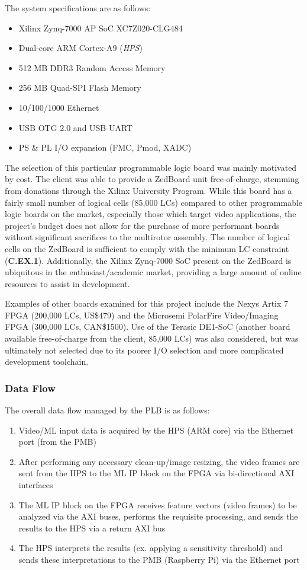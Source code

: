 The system specifications are as follows\cite{zedboard}:
\begin{itemize}
\item Xilinx Zynq-7000 AP SoC XC7Z020-CLG484
\item Dual-core ARM Cortex-A9 (\textit{HPS})
\item 512 MB DDR3 Random Access Memory
\item 256 MB Quad-SPI Flash Memory
\item 10/100/1000 Ethernet 
\item USB OTG 2.0 and USB-UART 
\item PS \& PL I/O expansion (FMC, Pmod, XADC)
\end{itemize}

The selection of this particular programmable logic board was mainly motivated by cost. The client was able to provide a ZedBoard unit free-of-charge, stemming from donations through the Xilinx University Program. While this board has a fairly small number of logical cells (85,000 LCs) compared to other programmable logic boards on the market, especially those which target video applications, the project's budget does not allow for the purchase of more performant boards without significant sacrifices to the multirotor assembly. The number of logical cells on the ZedBoard is sufficient to comply with the minimum LC constraint (\textbf{C.EX.1}). Additionally, the Xilinx Zynq-7000 SoC present on the ZedBoard is ubiquitous in the enthusiast/academic market, providing a large amount of online resources to assist in development.

Examples of other boards examined for this project include the Nexys Artix 7 FPGA (200,000 LCs, US\$479)\cite{nexys} and the Microsemi PolarFire Video/Imaging FPGA (300,000 LCs, CAN\$1500)\cite{microsemi}. Use of the Terasic DE1-SoC (another board available free-of-charge from the client, 85,000 LCs) was also considered, but was ultimately not selected due to its poorer I/O selection and more complicated development toolchain.

\subsubsection{Data Flow}
The overall data flow managed by the PLB is as follows:
\begin{enumerate}
\item Video/ML input data is acquired by the HPS (ARM core) via the Ethernet port (from the PMB)
\item After performing any necessary clean-up/image resizing, the video frames are sent from the HPS to the ML IP block on the FPGA via bi-directional AXI interfaces
\item The ML IP block on the FPGA receives feature vectors (video frames) to be analyzed via the AXI buses, performs the requisite processing, and sends the results to the HPS via a return AXI bus
\item The HPS interprets the results (ex. applying a sensitivity threshold) and sends these interpretations to the PMB (Raspberry Pi) via the Ethernet port
\end{enumerate}

